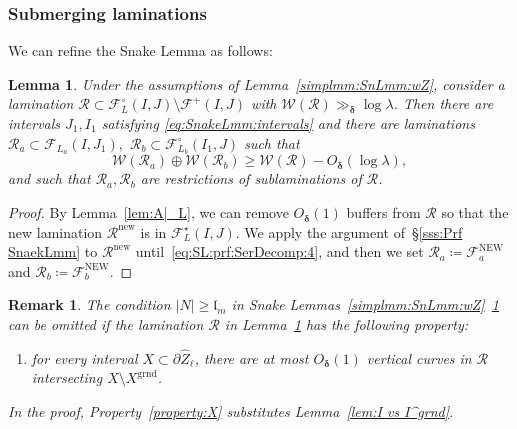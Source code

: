 \documentclass{amsart}
\newcommand{\1}{{\mathbb 1 }}
\newcommand{\Fam}{{\mathcal F}}
\newcommand{\Width}{{\mathcal W}}
\newcommand\RR{\mathcal{R}}
\newcommand{\wZ}{{\widehat Z}}
\newcommand{\str}{{\star}}
\newcommand{\length}{{\mathfrak l}}
\newcommand{\grnd}{{\operatorname{grnd}}}
\newcommand\new{{\operatorname{new}}}
\newcommand\NEW{{\operatorname{NEW}}}
\newtheorem{lem}[thm]{Lemma}
\newtheorem{rem}[thm]{Remark}
\theoremstyle{remark}
\numberwithin{equation}{section}
\theoremstyle{definition}
\newcommand{\bdelta}{{\boldsymbol{ \delta}}}
\begin{document}
\subsubsection{Submerging laminations} We can refine the Snake Lemma as follows:

\begin{lem}
\label{lem:SL:subm rect}
Under the assumptions of Lemma~\ref{simplmm:SnLmm:wZ}, consider a lamination $\RR\subset \Fam^\circ_L (I,J)\setminus \Fam^+(I,J)$ with $\Width(\RR)\gg_\bdelta \log \lambda$. Then there are intervals $J_1,I_1$ satisfying \eqref{eq:SnakeLmm:intervals} and there are laminations $\RR_a\subset \Fam_{L_a}(I,J_1),$ $\RR_b\subset \Fam^\circ_{L_b} (I_1,J)$ such that \[\Width(\RR_a)\oplus \Width(\RR_b)\ge \Width(\RR)-O_\bdelta(\log \lambda),\]
and such that $\RR_a,\RR_b$ are restrictions of sublaminations of $\RR$.
\end{lem}
\begin{proof}
By Lemma~\ref{lem:A|_L}, we can remove $O_\bdelta(1)$ buffers from $\RR$ so that the new lamination $\RR^\new$ is in $\Fam^\str_L(I,J)$. We apply the argument of~\S\ref{sss:Prf SnaekLmm} to $\RR^\new$ until~\eqref{eq:SL:prf:SerDecomp:4}, and then we set $\RR_a\coloneqq \Fam^\NEW_a$ and $\RR_b\coloneqq \Fam^\NEW_b$.
\end{proof}


\begin{rem} \label{rem:SL:ShallowScale} 
The condition $|N|\ge \length_{m}$ in Snake Lemmas~\ref{simplmm:SnLmm:wZ}~\ref{lem:SL:subm rect} can be omitted if the lamination $\RR$ in Lemma~\ref{lem:SL:subm rect} has the following property:
\begin{enumerate}[label=\text{(\Alph*)},start=24,font=\normalfont,leftmargin=*]
\item\label{property:X} for every interval $X\subset \partial \wZ_\ell$, there are at most $O_\bdelta(1)$ vertical curves in $\RR$ intersecting $X\setminus X^\grnd$.
\end{enumerate}
In the proof, Property~\ref{property:X} substitutes Lemma~\ref{lem:I vs I^grnd}.
\end{rem}
\end{document}

